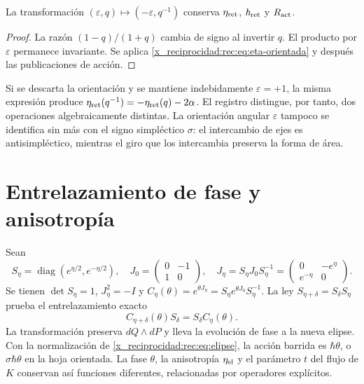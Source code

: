 \begin{corollary}
La transformación \((\varepsilon,q)\mapsto(-\varepsilon,q^{-1})\) conserva \(\eta_{\rm ret}\), \(\hbar_{\rm ret}\) y \(R_{\rm act}\).
\end{corollary}
\begin{proof}
La razón \((1-q)/(1+q)\) cambia de signo al invertir \(q\). El producto por \(\varepsilon\) permanece invariante. Se aplica \eqref{x_reciprocidad:rec:eq:eta-orientada} y después las publicaciones de acción.
\end{proof}

Si se descarta la orientación y se mantiene indebidamente \(\varepsilon=+1\), la misma expresión produce \(\eta_{\rm ret}(q^{-1})=-\eta_{\rm ret}(q)-2\alpha\). El registro distingue, por tanto, dos operaciones algebraicamente distintas. La orientación angular \(\varepsilon\) tampoco se identifica sin más con el signo simpléctico \(\sigma\): el intercambio de ejes es antisimpléctico, mientras el giro que los intercambia preserva la forma de área.

\section{Entrelazamiento de fase y anisotropía}

Sean
\[
 S_\eta=\operatorname{diag}(e^{\eta/2},e^{-\eta/2}),\quad
 J_0=\begin{pmatrix}0&-1\\1&0\end{pmatrix},\quad
 J_\eta=S_\eta J_0S_\eta^{-1}
       =\begin{pmatrix}0&-e^\eta\\e^{-\eta}&0\end{pmatrix}.
\]
Se tienen \(\det S_\eta=1\), \(J_\eta^2=-I\) y
\(C_\eta(\theta)=e^{\theta J_\eta}=S_\eta e^{\theta J_0}S_\eta^{-1}\).
La ley \(S_{\eta+\delta}=S_\delta S_\eta\) prueba el entrelazamiento exacto
\begin{equation}
 C_{\eta+\delta}(\theta)S_\delta=S_\delta C_\eta(\theta).
 \label{x_reciprocidad:rec:eq:entrelazamiento}
\end{equation}
La transformación preserva \(dQ\wedge dP\) y lleva la evolución de fase a la nueva elipse. Con la normalización de \eqref{x_reciprocidad:rec:eq:elipse}, la acción barrida es \(\hbar\theta\), o \(\sigma\hbar\theta\) en la hoja orientada. La fase \(\theta\), la anisotropía \(\eta_{\rm el}\) y el parámetro \(t\) del flujo de \(K\) conservan así funciones diferentes, relacionadas por operadores explícitos.

